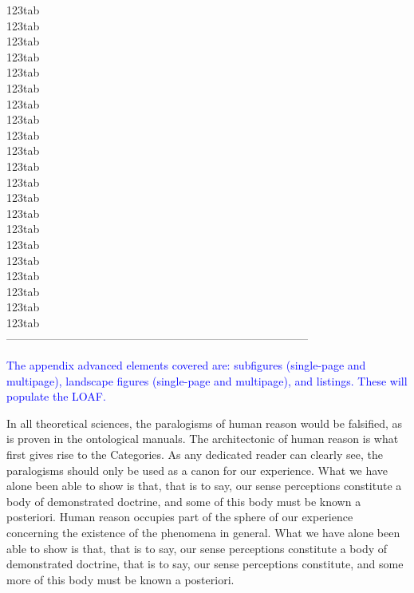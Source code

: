 \documentclass[phd]{ndsu-thesis-2022}
\newcommand\italk[1]{\textcolor{blue}{#1}}  %
\begin{document}
\begin{tabbing}
\>\: 123tab      \\
\>\: 123tab      \\
\>\: 123tab      \\
\>\: 123tab      \\
\>\: 123tab      \\
\>\: 123tab      \\
\>\: 123tab      \\
\>\: 123tab      \\
\>\: 123tab      \\
\>\: 123tab      \\
\>\: 123tab      \\
\>\: 123tab      \\
\>\: 123tab      \\
\>\: 123tab      \\
\>\: 123tab      \\
\>\: 123tab      \\
\>\: 123tab      \\
\>\: 123tab      \\
\>\: 123tab      \\
\>\: 123tab      \\
\>\: 123tab      \\
\>---------------------------------------------------------------------------------\\
\end{tabbing}
\endgroup


\italk{The appendix advanced elements covered are: subfigures (single-page and multipage), landscape figures (single-page and multipage), and listings. These will populate the LOAF.}

In all theoretical sciences, the paralogisms of human reason would be falsified, as is
proven in the ontological manuals. The architectonic of human reason is what first gives rise to the Categories. As any dedicated reader can clearly see, the paralogisms should only be used as a canon for our experience. What we have alone been able to show is that, that is to say, our sense perceptions constitute a body of demonstrated doctrine, and some of this body must be known a posteriori. Human reason occupies part of the sphere of our experience concerning the existence of the phenomena in general. What we have alone been able to show is that, that is to say, our sense perceptions constitute a body of demonstrated doctrine,  that is to say, our sense perceptions constitute, and some more of this body must be known a posteriori.
\end{document}
